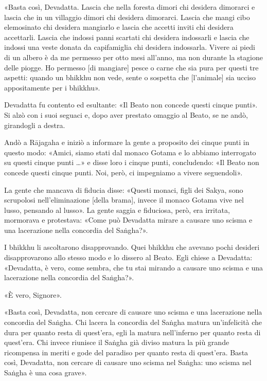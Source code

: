 «Basta così, Devadatta. Lascia che nella foresta dimori chi desidera
dimorarci e lascia che in un villaggio dimori chi desidera dimorarci.
Lascia che mangi cibo elemosinato chi desidera mangiarlo e lascia che
accetti inviti chi desidera accettarli. Lascia che indossi panni
scartati chi desidera indossarli e lascia che indossi una veste donata
da capifamiglia chi desidera indossarla. Vivere ai piedi di un albero è
da me permesso per otto mesi all’anno, ma non durante la stagione delle
piogge. \label{pag298}Ho permesso [di mangiare] pesce o carne che sia pura per questi
tre aspetti: quando un bhikkhu non vede, sente o sospetta che
[l’animale] sia ucciso appositamente per i bhikkhu».


Devadatta fu contento ed esultante: «Il Beato non concede questi cinque
punti». Si alzò con i suoi seguaci e, dopo aver prestato omaggio al
Beato, se ne andò, girandogli a destra.


Andò a Rājagaha e iniziò a informare la gente a proposito dei cinque
punti in questo modo: «Amici, siamo stati dal monaco Gotama e lo abbiamo
interrogato su questi cinque punti …» e disse loro i cinque punti,
concludendo: «Il Beato non concede questi cinque punti. Noi, però, ci
impegniamo a vivere seguendoli».


La gente che mancava di fiducia disse: «Questi monaci, figli dei Sakya,
sono scrupolosi nell’eliminazione [della brama], invece il monaco Gotama
vive nel lusso, pensando al lusso». La gente saggia e fiduciosa, però,
era irritata, mormorava e protestava: «Come può Devadatta mirare a
causare uno scisma e una lacerazione nella concordia del Saṅgha?».


I bhikkhu li ascoltarono disapprovando. Quei bhikkhu che avevano pochi
desideri disapprovarono allo stesso modo e lo dissero al Beato. Egli
chiese a Devadatta: «Devadatta, è vero, come sembra, che tu stai mirando
a causare uno scisma e una lacerazione nella concordia del Saṅgha?».


«È vero, Signore».


«Basta così, Devadatta, non cercare di causare uno scisma e una
lacerazione nella concordia del Saṅgha. Chi lacera la concordia del
Saṅgha matura un’infelicità che dura per quanto resta di quest’era, egli
la matura nell’inferno per quanto resta di quest’era. Chi invece
riunisce il Saṅgha già diviso matura la più grande ricompensa in meriti
e gode del paradiso per quanto resta di quest’era. Basta così,
Devadatta, non cercare di causare uno scisma nel Saṅgha: uno scisma nel
Saṅgha è una cosa grave».


